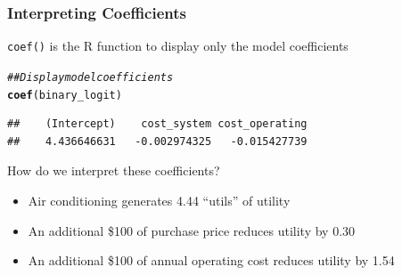 \documentclass{beamer}\usepackage[]{graphicx}\usepackage[]{xcolor}
\makeatletter
\newcommand{\hlcom}[1]{\textcolor[rgb]{0.678,0.584,0.686}{\textit{#1}}}%
\newcommand{\hlstd}[1]{\textcolor[rgb]{0.345,0.345,0.345}{#1}}%
\newcommand{\hlkwd}[1]{\textcolor[rgb]{0.737,0.353,0.396}{\textbf{#1}}}%
\newenvironment{kframe}{%
 \def\at@end@of@kframe{}%
 \ifinner\ifhmode%
  \def\at@end@of@kframe{\end{minipage}}%
  \begin{minipage}{\columnwidth}%
 \fi\fi%
 \def\FrameCommand##1{\hskip\@totalleftmargin \hskip-\fboxsep
 \colorbox{shadecolor}{##1}\hskip-\fboxsep
     \hskip-\linewidth \hskip-\@totalleftmargin \hskip\columnwidth}%
 \MakeFramed {\advance\hsize-\width
   \@totalleftmargin\z@ \linewidth\hsize
   \@setminipage}}%
 {\par\unskip\endMakeFramed%
 \at@end@of@kframe}
\newenvironment{knitrout}{}{} %
\makeatother
\begin{document}
\begin{frame}[fragile]\frametitle{Interpreting Coefficients}
    \texttt{coef()} is the R function to display only the model coefficients
\begin{knitrout}\footnotesize
{}\color{fgcolor}\begin{kframe}
\begin{alltt}
\hlcom{## Display model coefficients}
\hlkwd{coef}\hlstd{(binary_logit)}
\end{alltt}
\begin{verbatim}
##    (Intercept)    cost_system cost_operating 
##    4.436646631   -0.002974325   -0.015427739
\end{verbatim}
\end{kframe}
\end{knitrout}
    \vspace{2ex}
    How do we interpret these coefficients?
    \begin{itemize}
        \item Air conditioning generates 4.44 ``utils'' of utility
        \item An additional \$100 of purchase price reduces utility by 0.30
        \item An additional \$100 of annual operating cost reduces utility by 1.54
    \end{itemize}
\end{frame}
\end{document}

